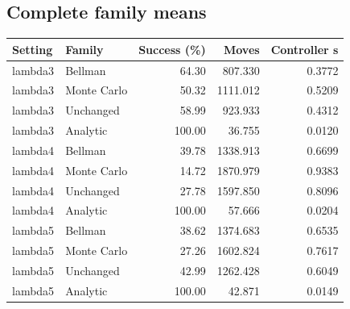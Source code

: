 \documentclass[10pt]{article}
\begin{document}
\subsection*{Complete family means}
{\small\centering\par
\begin{tabular}{llrrr}
\toprule
Setting & Family & Success (\%) & Moves & Controller s \\ \midrule
lambda3 & Bellman & 64.30 & 807.330 & 0.3772 \\
lambda3 & Monte Carlo & 50.32 & 1111.012 & 0.5209 \\
lambda3 & Unchanged & 58.99 & 923.933 & 0.4312 \\
lambda3 & Analytic & 100.00 & 36.755 & 0.0120 \\
lambda4 & Bellman & 39.78 & 1338.913 & 0.6699 \\
lambda4 & Monte Carlo & 14.72 & 1870.979 & 0.9383 \\
lambda4 & Unchanged & 27.78 & 1597.850 & 0.8096 \\
lambda4 & Analytic & 100.00 & 57.666 & 0.0204 \\
lambda5 & Bellman & 38.62 & 1374.683 & 0.6535 \\
lambda5 & Monte Carlo & 27.26 & 1602.824 & 0.7617 \\
lambda5 & Unchanged & 42.99 & 1262.428 & 0.6049 \\
lambda5 & Analytic & 100.00 & 42.871 & 0.0149 \\
\bottomrule
\end{tabular}
\par}
\end{document}
